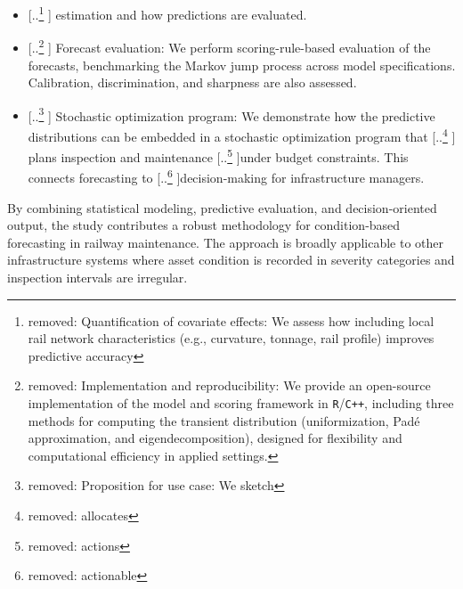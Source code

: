 \documentclass{article}
\providecommand{\DIFadd}[1]{{\protect\color{blue} \sf #1}} %
\providecommand{\DIFdel}[1]{{\protect\color{red} [..\footnote{removed: #1} ]}} %
\providecommand{\DIFaddbegin}{} %
\providecommand{\DIFaddend}{} %
\providecommand{\DIFdelbegin}{} %
\providecommand{\DIFdelend}{} %
\begin{document}
\begin{itemize}
{    }%
\item%
\DIFdel{Quantification of covariate effects: We assess how including local rail network characteristics (e.g., curvature, tonnage, rail profile) improves predictive accuracy}\DIFdelend \DIFaddbegin \DIFadd{estimation and how predictions are evaluated}\DIFaddend .
     \item \DIFdelbegin \DIFdel{Implementation and reproducibility: We provide an open-source implementation of the model and scoring framework in \texttt{R}/\texttt{C++}, including three methods for computing the transient distribution (uniformization, Padé approximation, and eigendecomposition), designed for flexibility and computational efficiency in applied settings. }\DIFdelend \DIFaddbegin \DIFadd{Forecast evaluation: We perform scoring-rule-based evaluation of the forecasts, benchmarking the Markov jump process across model specifications. Calibration, discrimination, and sharpness are also assessed. %
    }\DIFaddend \item \DIFdelbegin \DIFdel{Proposition for use case: We sketch }\DIFdelend \DIFaddbegin \DIFadd{Stochastic optimization program: We demonstrate }\DIFaddend how the predictive distributions can be embedded in a stochastic optimization program that \DIFdelbegin \DIFdel{allocates }\DIFdelend \DIFaddbegin \DIFadd{plans }\DIFaddend inspection and maintenance \DIFdelbegin \DIFdel{actions }\DIFdelend under budget constraints. This connects forecasting to \DIFdelbegin \DIFdel{actionable }\DIFdelend decision-making for infrastructure managers.
\end{itemize}

By combining statistical modeling, predictive evaluation, and decision-oriented output, the study contributes a robust methodology for condition-based forecasting in railway maintenance. The approach is broadly applicable to other infrastructure systems where asset condition is recorded in severity categories and inspection intervals are irregular.
\end{document}
